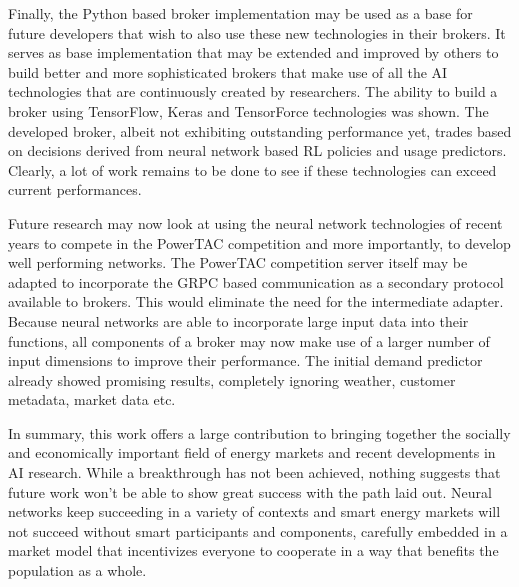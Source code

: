 Finally, the Python based broker implementation may be used as a base for future developers that wish to also use these
new technologies in their brokers. It serves as base implementation that may be extended and improved by others to build
better and more sophisticated brokers that make use of all the \ac{AI} technologies that are continuously created by
researchers. The ability to build a broker using TensorFlow, Keras and TensorForce technologies was shown. The
developed broker, albeit not exhibiting outstanding performance yet, trades based on decisions derived from neural network based \ac{RL}
policies and usage predictors. Clearly, a lot of work remains to be done to see if these technologies can exceed current
performances.


Future research may now look at using the neural network technologies of recent years to compete in the \ac{PowerTAC}
competition and more importantly, to develop well performing networks. The \ac{PowerTAC} competition server itself may be adapted to incorporate the \ac{GRPC} based communication
as a secondary protocol available to brokers. This would eliminate the need for the intermediate adapter. Because
neural networks are able to incorporate large input data into their functions, all components of a broker may now make use of a
larger number of input dimensions to improve their performance. The initial demand predictor already showed promising
results, completely ignoring weather, customer metadata, market data etc.

In summary, this work offers a large contribution to bringing together the socially and economically important field of
energy markets and recent developments in \ac{AI} research. While a breakthrough has not been achieved, nothing suggests
that future work won't be able to show great success with the path laid out. Neural networks keep succeeding in a variety of
contexts and smart energy markets will not succeed without smart participants and components, carefully embedded in a
market model that incentivizes everyone to cooperate in a way that benefits the population as a whole.
